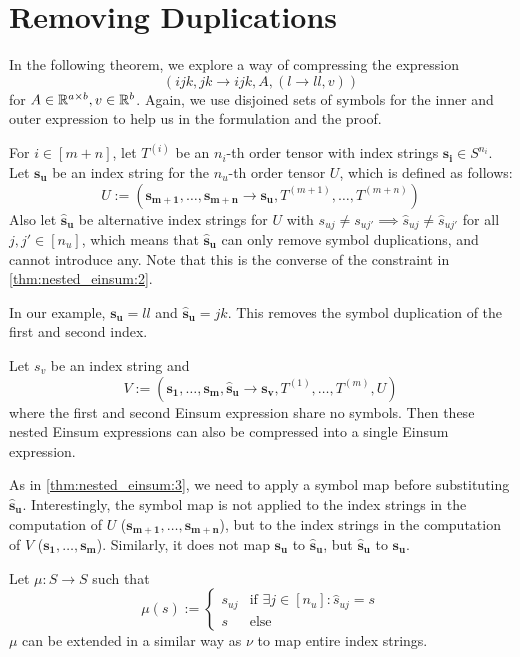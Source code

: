 \section{Removing Duplications}

In the following theorem, we explore a way of compressing the expression
$$(ijk, jk \rightarrow ijk, A, (l \rightarrow ll, v))$$
for $A \in \mathbb{R}^{a \times b}, v \in \mathbb{R}^b$.
Again, we use disjoined sets of symbols for the inner and outer expression to help us in the formulation and the proof.

\begin{theorem}
    \label{thm:nested_einsum:3}

    For $i \in [m + n]$, let $T^{(i)}$ be an $n_i$-th order tensor with index strings $\bm{s_i} \in S^{n_i}$.
    Let $\bm{s_u}$ be an index string for the $n_u$-th order tensor $U$, which is defined as follows:
    $$U := (\bm{s_{m + 1}},\dots,\bm{s_{m + n}} \rightarrow \bm{s_u}, T^{(m + 1)},\dots,T^{(m + n)})$$
    Also let $\bm{\hat{s}_u}$ be alternative index strings for $U$ with $s_{uj} \neq s_{uj'} \implies \hat{s}_{uj} \neq \hat{s}_{uj'}$ for all $j, j' \in [n_u]$,
    which means that $\bm{\hat{s}_u}$ can only remove symbol duplications, and cannot introduce any.
    Note that this is the converse of the constraint in \autoref{thm:nested_einsum:2}.

    In our example, $\bm{s_u} = ll$ and $\bm{\hat{s}_u} = jk$.
    This removes the symbol duplication of the first and second index.

    Let $s_v$ be an index string and
    $$V := (\bm{s_1},\dots,\bm{s_m}, \bm{\hat{s}_u} \rightarrow \bm{s_v}, T^{(1)},\dots,T^{(m)}, U)$$
    where the first and second Einsum expression share no symbols.
    Then these nested Einsum expressions can also be compressed into a single Einsum expression.

    As in \autoref{thm:nested_einsum:3}, we need to apply a symbol map before substituting $\bm{\hat{s}_u}$.
    Interestingly, the symbol map is not applied to the index strings in the computation of $U$ ($\bm{s_{m + 1}},\dots,\bm{s_{m + n}}$),
    but to the index strings in the computation of $V$ ($\bm{s_1},\dots,\bm{s_m}$).
    Similarly, it does not map $\bm{s_u}$ to $\bm{\hat{s}_u}$, but $\bm{\hat{s}_u}$ to $\bm{s_u}$.

    Let $\mu: S \rightarrow S$ such that
    $$\mu(s) := \begin{cases}
            s_{uj} & \text{if }\exists j \in [n_u]: \hat{s}_{uj} = s \\
            s      & \text{else}
        \end{cases}$$
    $\mu$ can be extended in a similar way as $\nu$ to map entire index strings.


\end{theorem}
